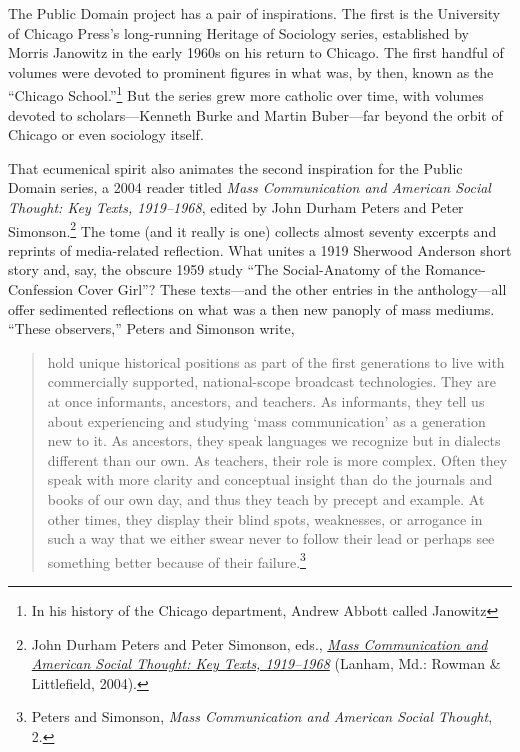 \documentclass[nohyper,openany,nobib]{tufte-book}
\begin{document}
The Public Domain project has a pair of inspirations. The first is the
University of Chicago Press's long-running Heritage of Sociology series,
established by Morris Janowitz in the early 1960s on his return to
Chicago. The first handful of volumes were devoted to prominent figures
in what was, by then, known as the ``Chicago School.''\footnote{In his history of the Chicago department, Andrew Abbott called
  Janowitz} But the series
grew more catholic over time, with volumes devoted to scholars---Kenneth
Burke and Martin Buber---far beyond the orbit of Chicago or even
sociology itself.

That ecumenical spirit also animates the second inspiration for the
Public Domain series, a 2004 reader titled \emph{Mass Communication and
American Social Thought: Key Texts, 1919--1968}, edited by John Durham
Peters and Peter Simonson.\footnote{John Durham Peters and Peter Simonson, eds.,
  \emph{\href{http://www.worldcat.org/oclc/54374652}{Mass Communication
  and American Social Thought: Key Texts, 1919--1968}} (Lanham, Md.:
  Rowman \& Littlefield, 2004).} The tome (and it really is one) collects
almost seventy excerpts and reprints of media-related reflection. What
unites a 1919 Sherwood Anderson short story and, say, the obscure 1959
study ``The Social-Anatomy of the Romance-Confession Cover Girl''? These
texts---and the other entries in the anthology---all offer sedimented
reflections on what was a then new panoply of mass mediums. ``These
observers,'' Peters and Simonson write,

\begin{quote}
hold unique historical positions as part of the first generations to
live with commercially supported, national-scope broadcast technologies.
They are at once informants, ancestors, and teachers. As informants,
they tell us about experiencing and studying `mass communication' as a
generation new to it. As ancestors, they speak languages we recognize
but in dialects different than our own. As teachers, their role is more
complex. Often they speak with more clarity and conceptual insight than
do the journals and books of our own day, and thus they teach by precept
and example. At other times, they display their blind spots, weaknesses,
or arrogance in such a way that we either swear never to follow their
lead or perhaps see something better because of their failure.\footnote{Peters and Simonson, \emph{Mass Communication and American Social
  Thought}, 2.}
\end{quote}
\end{document}
